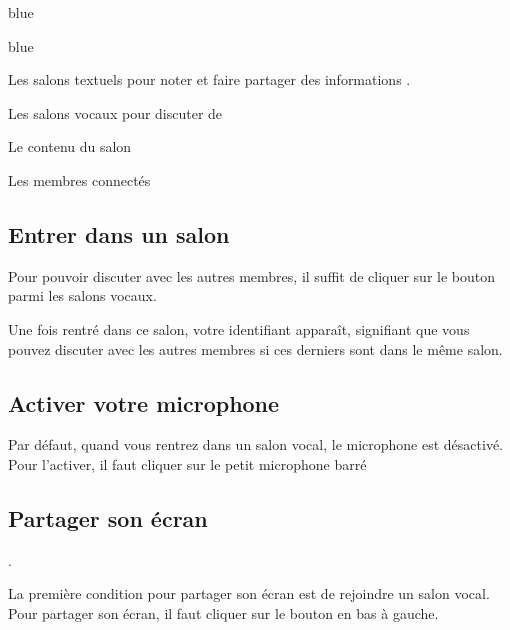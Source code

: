 {\begin{items}{blue}{\Triangle}
	\begin{items}{blue}{\Bullet}
		\item Les salons textuels pour noter et faire partager des informations .
		\item Les salons vocaux pour discuter de 
	\end{items}


	\item Le contenu du salon
	\item Les membres connectés
\end{items}



\subsection{Entrer dans un salon}

Pour pouvoir discuter avec les autres membres, il suffit de cliquer sur le bouton  parmi les salons vocaux.


Une fois rentré dans ce salon, votre identifiant apparaît, signifiant que vous pouvez discuter avec les autres membres si ces derniers sont dans le même salon.

\subsection{Activer votre microphone}

Par défaut, quand vous rentrez dans un salon vocal, le microphone est désactivé. Pour l'activer, il faut cliquer sur le petit microphone barré 




\subsection{Partager son écran}.

La première condition pour partager son écran est de rejoindre un salon vocal. \\

Pour partager son écran, il faut cliquer sur le bouton  en bas à gauche.


}
